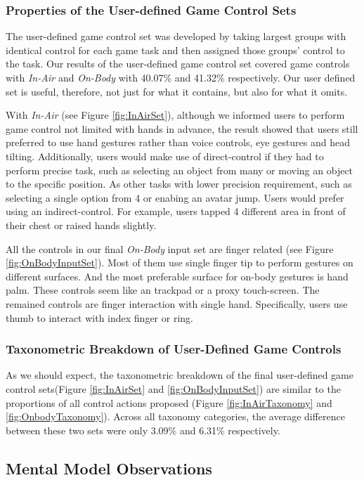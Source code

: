 \documentclass{sigchi}
\begin{document}
   \subsubsection{Properties of the User-defined Game Control Sets}
   The user-defined game control set was developed by taking largest groups with identical control for each game task and then assigned those groups' control to the task. 
   Our results of the user-defined game control set covered game controls with \emph{In-Air} and \emph{On-Body} with 40.07\% and 41.32\% respectively. Our user defined set is useful, therefore, not just for what it contains, but also for what it omits.

   With \emph{In-Air} (see Figure \ref{fig:InAirSet}), although we informed users to perform game control not limited with hands in advance, the result showed that users still preferred to use hand gestures rather than voice controls, eye gestures and head tilting. Additionally, users would make use of direct-control if they had to perform precise task, such as selecting an object from many or moving an object to the specific position. As other tasks with lower precision requirement, such as selecting a single option from 4 or enabing an avatar jump. Users would prefer using an indirect-control. For example, users tapped 4 different area in front of their chest or raised hands slightly.


    All the controls in our final \emph{On-Body} input set are finger related (see Figure \ref{fig:OnBodyInputSet}). Most of them use single finger tip to perform gestures on different surfaces. And the most preferable surface for on-body gestures is hand palm. These controls seem like an trackpad or a proxy touch-screen. The remained controls are finger interaction with single hand. Specifically, users use thumb to interact with index finger or ring.

   \subsubsection{Taxonometric Breakdown of User-Defined Game Controls}
   As we should expect, the taxonometric breakdown of the final user-defined game control sets(Figure \ref{fig:InAirSet} and \ref{fig:OnBodyInputSet}) are similar to the proportions of all control actions proposed (Figure \ref{fig:InAirTaxonomy} and \ref{fig:OnbodyTaxonomy}). Across all taxonomy categories, the average difference between these two sets were only 3.09\% and 6.31\% respectively.

  \subsection{Mental Model Observations}
\end{document}

